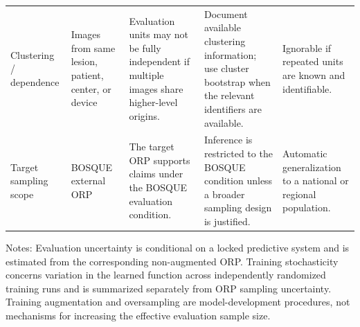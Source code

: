 \begin{table}[h!]
\begin{tabular}{p{3.0cm}p{3.0cm}p{4.2cm}p{4.2cm}p{3.7cm}}
\addlinespace
Clustering / dependence & Images from same lesion, patient, center, or device & Evaluation units may not be fully independent if multiple images share higher-level origins. & Document available clustering information; use cluster bootstrap when the relevant identifiers are available. & Ignorable if repeated units are known and identifiable. \\
\addlinespace
Target sampling scope & BOSQUE external ORP & The target ORP supports claims under the BOSQUE evaluation condition. & Inference is restricted to the BOSQUE condition unless a broader sampling design is justified. & Automatic generalization to a national or regional population. \\
\bottomrule
\end{tabular}
\begin{flushleft}
\footnotesize Notes: Evaluation uncertainty is conditional on a locked predictive system and is estimated from the corresponding non-augmented ORP. Training stochasticity concerns variation in the learned function across independently randomized training runs and is summarized separately from ORP sampling uncertainty. Training augmentation and oversampling are model-development procedures, not mechanisms for increasing the effective evaluation sample size.
\end{flushleft}
\end{table}

